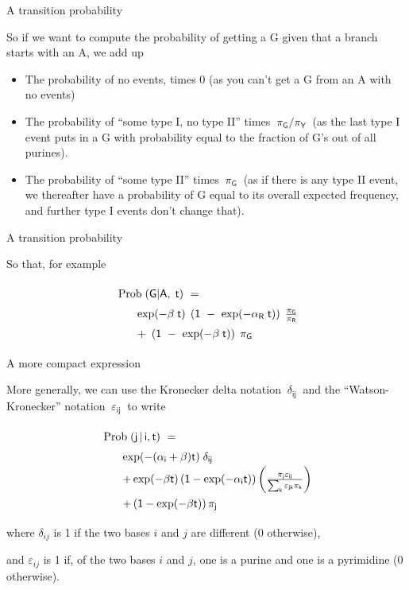 \documentclass[bluish,slideColor,colorBG,pdf]{prosper}
\def\prob{{\rm \;Prob\;}}
\begin{document}
\begin{slide}[Replace]{A transition probability}

So if we want to compute the probability of getting a G given that a
branch starts with an A, we add up
\begin{itemize}
\item The probability of no events, times 0 (as you can't get a G from an A
with no events)
\item The probability of ``some type I, no type II'' times
$~\mathsf{\pi_G/\pi_Y}~$ (as
the last type I event puts in a G with probability equal to the fraction of
G's out of all purines).
\item The probability of ``some type II'' times $~\mathsf{\pi_G}~$ (as if there is any
type II event, we thereafter have a probability of G equal to its overall
expected frequency, and further type I events don't change that).
\end{itemize}

\end{slide}

\begin{slide}[Replace]{A transition probability}

So that, for example

{
\[
\renewcommand{\arraystretch}{1.5}
\begin{array}{l}
\mathsf{\prob(G|A,\;t) \ =}\\
\qquad \mathsf{\exp(-\beta\;t)\;\left(1\ -\ \exp(-\alpha_R\;t)\right)\;\frac{\pi_G}{\pi_R}}\\
\qquad \mathsf{+ \ \left(1\  -\  \exp(-\beta\;t)\right)\;\pi_G }
\end{array}
\]
}

\end{slide}

\begin{slide}[Replace]{A more compact expression}

More generally, we can use the Kronecker delta notation $\mathsf{~\delta_{ij}~}$
and the ``Watson-Kronecker'' notation $\mathsf{~\varepsilon_{ij}~}$ to write

{
\[
\begin{array}{l}
\mathsf{\prob(j\, |\, i, t) \ =}\\
\qquad  \mathsf{\exp(-(\alpha_i+\beta)t)\;\delta_{ij}}\\
\qquad  \mathsf{+ \exp(-\beta t)\left(1 - \exp(-\alpha_it)\right) \left(\frac{\pi_j \varepsilon_{ij}}{\sum_k \varepsilon_{jk}\pi_k} \right)}\\
\qquad  \mathsf{+ \left(1 - \exp(-\beta t)\right) \pi_j}
\end{array}
\]
}
\bigskip

where $\delta_{ij}$ is 1 if the two bases $i$ and $j$ are different (0 otherwise),

and $\varepsilon_{ij}$ is 1 if, of the two bases $i$ and $j$, one is a purine and
one is a pyrimidine (0 otherwise).

\end{slide}
\end{document}
